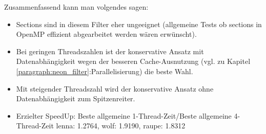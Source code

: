 Zusammenfassend kann man volgendes sagen:
\begin{itemize}
\item Sections sind in diesem Filter eher ungeeignet (allgemeine Tests ob sections in OpenMP effizient abgearbeitet werden wären erwünscht).
\item Bei geringen Threadszahlen ist der konservative Ansatz mit Datenabhängigkeit wegen der besseren Cache-Ausnutzung (vgl. zu Kapitel \ref{paragraph:neon_filter}:Parallelisierung) die beste Wahl.
\item Mit steigender Threadszahl wird der konservative Ansatz ohne Datenabhängigkeit zum Spitzenreiter.
\item Erzielter SpeedUp: Beste allgemeine 1-Thread-Zeit/Beste allgemeine 4-Thread-Zeit
lenna: 1.2764, wolf: 1.9190, raupe: 1.8312
\end{itemize}

